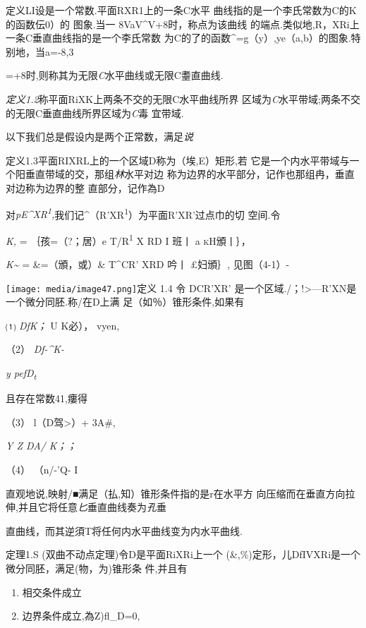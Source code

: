 \documentclass{article}
\begin{document}
定义LI设是一个常数.平面RXR1上的一条C水平
曲线指的是一个李氏常数为C的K的函数伝0）的 图象.当一
8VaV\^{}V+8时，称点为该曲线
的端点.类似地,R，XRi上一条C垂直曲线指的是一个李氏常数
为C的了的函数\^{}=g（y）,ye（a,b）的图象.特别地，当a=-8,3

=+8时,则称其为无限\emph{C}水平曲线或无限C耋直曲线.

\emph{定义1.2}称平面RiXK上两条不交的无限C水平曲线所界
区域为\emph{C}水平带域;两条不交的无限C垂直曲线所界区域为\emph{C}毒
宜带域.

以下我们总是假设内是两个正常数，满足\emph{说}

定义1.3平面RIXRL上的一个区域D称为（埃,E）矩形,若
它是一个内水平带域与一个阳垂直带域的交，那组\emph{林}水平对边
称为边界的水平部分，记作也那组冉，垂直对边称为边界的整 直部分，记作為D

对\emph{pE\^{}XR\textsuperscript{1},}我们记\^{}（R'XR\textsuperscript{1}）为平面R'XR'过点巾的切
空间.令

\emph{K,} = ｛孩=（?；居）e T/R\textsuperscript{1} X RD I 班丨 a
\textsc{kH}頒丨｝，

\emph{K\textasciitilde{}} = \&=（頒，或）\& T\^{}CR' XRD\textbar{} 吟丨
£妇頒\textbar{}｝, 见图（4-1）-

\texttt{[image: media/image47.png]}定义
1.4 令 DCR'XR' 是一个区域./；!\textgreater{}---R'XN是
一个微分同胚.称/在D上满 足（如％）锥形条件,如果有

⑴ \emph{DfK；} U K必）， vyen,

（2） \emph{Df-\^{}K-}

\emph{y pefD\textsubscript{t}}

且存在常数41,瘻得

（3） l（D驾\textgreater{}）+ \textbar{}3A\textbar{}\#\textbar{},

\emph{Y Z DA/ K；；}

（4） \textbar{}（n/-'Q- I

直观地说,映射/■满足（払,知）锥形条件指的是r在水平方
向压缩而在垂直方向拉伸,并且它将任意\emph{匕}垂直曲线奏为\emph{孔}垂

直曲线，而其逆須T将任何内水平曲线变为内水平曲线.

定理1.S (双曲不动点定理)令D是平面RiXRi上一个
(\&,\%)定形，儿DfIVXRi是一个微分同胚，满足(物，为)锥形条 件,并且有

\begin{enumerate}
\def\labelenumi{(\arabic{enumi})}
\item
  相交条件成立
\item
  边界条件成立,為Z)fl\_D=0,
\end{enumerate}
\end{document}
